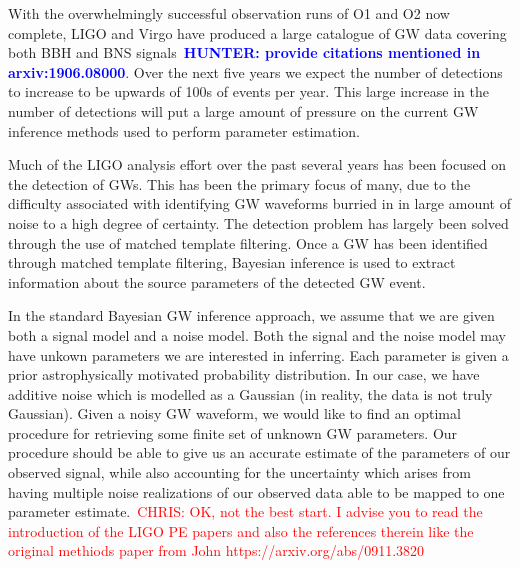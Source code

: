 \documentclass[%
showpacs,
 amsmath,amssymb,
 aps,
 twocolumn,
 prl,
 reprint,
floatfix,
]{revtex4-1}
\newcommand{\chris}[1]{\textcolor{red}{CHRIS: #1}}
\newcommand{\hunter}[1]{\textbf{\textcolor{blue}{HUNTER: #1}}}
\begin{document}
%
%
With the overwhelmingly successful observation runs of O1 and O2 
now complete, \ac{LIGO} and Virgo have produced a large 
catalogue of \ac{GW} data covering both \ac{BBH} and {BNS} signals~\hunter{provide 
citations mentioned in arxiv:1906.08000}. Over the next five years 
we expect the number of detections to increase to be upwards 
of 100s of events per year. This large increase in the number 
of detections will put a large amount of pressure on the current \ac{GW} inference 
methods used to perform parameter estimation.  

%
%
Much of the \ac{LIGO} analysis effort over the past several years has been focused 
on the detection of \ac{GW}s. This has been the primary 
focus of many, due to the difficulty associated 
with identifying \ac{GW} waveforms burried in 
in large amount of noise to a high degree of certainty. The detection problem has largely 
been solved through the use of matched template filtering\cite{0264-9381-33-21-215004}. 
Once a \ac{GW} has been identified through matched template filtering, Bayesian inference 
is used to extract information about the source 
parameters of the detected \ac{GW} event.

%
%
In the standard Bayesian \ac{GW} inference approach, we assume that we are
given both a signal model and a noise model. Both the signal and the 
noise model may have unkown parameters we are interested in inferring. 
Each parameter is given a prior astrophysically motivated probability 
distribution. In our case, we have additive noise which is modelled as 
a Gaussian (in reality, the data is not truly Gaussian). Given a noisy
\ac{GW} waveform, we would like to find an optimal procedure for retrieving
some finite set of unknown GW parameters. Our procedure should be able
to give us an accurate estimate of the parameters of our observed signal, while
also accounting for the uncertainty which arises from having multiple noise
realizations of our observed data able to be mapped to one parameter
estimate.~\chris{OK, not the best start. I advise you to read the introduction
of the LIGO PE papers and also the references therein like the original
methiods paper from John https://arxiv.org/abs/0911.3820}
\end{document}
